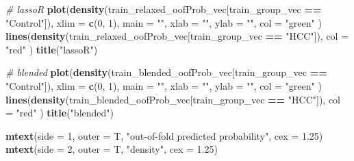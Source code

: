\documentclass[
]{book}
\newenvironment{Shaded}{\begin{snugshade}}{\end{snugshade}}
\newcommand{\CommentTok}[1]{\textcolor[rgb]{0.56,0.35,0.01}{\textit{#1}}}
\newcommand{\DataTypeTok}[1]{\textcolor[rgb]{0.13,0.29,0.53}{#1}}
\newcommand{\DecValTok}[1]{\textcolor[rgb]{0.00,0.00,0.81}{#1}}
\newcommand{\FloatTok}[1]{\textcolor[rgb]{0.00,0.00,0.81}{#1}}
\newcommand{\KeywordTok}[1]{\textcolor[rgb]{0.13,0.29,0.53}{\textbf{#1}}}
\newcommand{\NormalTok}[1]{#1}
\newcommand{\OperatorTok}[1]{\textcolor[rgb]{0.81,0.36,0.00}{\textbf{#1}}}
\newcommand{\StringTok}[1]{\textcolor[rgb]{0.31,0.60,0.02}{#1}}
\begin{document}
\begin{Shaded}
\begin{Highlighting}[]
\CommentTok{\# lassoR}
\KeywordTok{plot}\NormalTok{(}\KeywordTok{density}\NormalTok{(train\_relaxed\_oofProb\_vec[train\_group\_vec }\OperatorTok{==}\StringTok{ "Control"}\NormalTok{]),}
  \DataTypeTok{xlim =} \KeywordTok{c}\NormalTok{(}\DecValTok{0}\NormalTok{, }\DecValTok{1}\NormalTok{), }\DataTypeTok{main =} \StringTok{""}\NormalTok{, }\DataTypeTok{xlab =} \StringTok{""}\NormalTok{, }\DataTypeTok{ylab =} \StringTok{""}\NormalTok{, }\DataTypeTok{col =} \StringTok{"green"}
\NormalTok{)}
\KeywordTok{lines}\NormalTok{(}\KeywordTok{density}\NormalTok{(train\_relaxed\_oofProb\_vec[train\_group\_vec }\OperatorTok{==}\StringTok{ "HCC"}\NormalTok{]),}
  \DataTypeTok{col =} \StringTok{"red"}
\NormalTok{)}
\KeywordTok{title}\NormalTok{(}\StringTok{"lassoR"}\NormalTok{)}

\CommentTok{\# blended}
\KeywordTok{plot}\NormalTok{(}\KeywordTok{density}\NormalTok{(train\_blended\_oofProb\_vec[train\_group\_vec }\OperatorTok{==}\StringTok{ "Control"}\NormalTok{]),}
  \DataTypeTok{xlim =} \KeywordTok{c}\NormalTok{(}\DecValTok{0}\NormalTok{, }\DecValTok{1}\NormalTok{), }\DataTypeTok{main =} \StringTok{""}\NormalTok{, }\DataTypeTok{xlab =} \StringTok{""}\NormalTok{, }\DataTypeTok{ylab =} \StringTok{""}\NormalTok{, }\DataTypeTok{col =} \StringTok{"green"}
\NormalTok{)}
\KeywordTok{lines}\NormalTok{(}\KeywordTok{density}\NormalTok{(train\_blended\_oofProb\_vec[train\_group\_vec }\OperatorTok{==}\StringTok{ "HCC"}\NormalTok{]),}
  \DataTypeTok{col =} \StringTok{"red"}
\NormalTok{)}
\KeywordTok{title}\NormalTok{(}\StringTok{"blended"}\NormalTok{)}

\KeywordTok{mtext}\NormalTok{(}\DataTypeTok{side =} \DecValTok{1}\NormalTok{, }\DataTypeTok{outer =}\NormalTok{ T, }\StringTok{"out{-}of{-}fold predicted probability"}\NormalTok{, }\DataTypeTok{cex =} \FloatTok{1.25}\NormalTok{)}
\KeywordTok{mtext}\NormalTok{(}\DataTypeTok{side =} \DecValTok{2}\NormalTok{, }\DataTypeTok{outer =}\NormalTok{ T, }\StringTok{"density"}\NormalTok{, }\DataTypeTok{cex =} \FloatTok{1.25}\NormalTok{)}
\end{Highlighting}
\end{Shaded}
\end{document}
